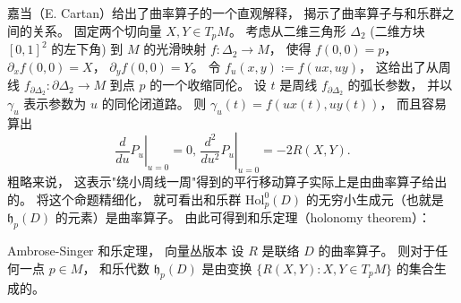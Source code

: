 嘉当（E. Cartan）给出了曲率算子的一个直观解释， 揭示了曲率算子与和乐群之间的关系。 固定两个切向量 $X,Y\in T_pM$。 考虑从二维三角形 $\Delta_2$ (二维方块 $[0,1]^2$ 的左下角) 到 $M$ 的光滑映射 $f:\Delta_2\to M$， 使得 $f(0,0)=p$， $\partial_xf(0,0)=X$， $\partial_yf(0,0)=Y$。 令 $f_u(x,y):=f(ux,uy)$， 这给出了从周线 $f_{\partial\Delta_2}:\partial\Delta_2\to M$ 到点 $p$ 的一个收缩同伦。 设 $t$ 是周线 $f_{\partial\Delta_2}$ 的弧长参数， 并以 $\gamma_u$ 表示参数为 $u$ 的同伦闭道路。 则 $\gamma_u(t)=f(ux(t),uy(t))$， 而且容易算出
$$
\left.\frac{d}{du}P_u\right|_{u=0}=0,\,\left.\frac{d^2}{du^2}P_u\right|_{u=0}=-2R(X,Y).
$$
粗略来说， 这表示"绕小周线一周"得到的平行移动算子实际上是由曲率算子给出的。 将这个命题精细化， 就可看出和乐群 $\text{Hol}_p^0(D)$ 的无穷小生成元（也就是 $\mathfrak{h}_p(D)$ 的元素）是曲率算子。 由此可得到和乐定理（holonomy theorem）：

\begin{theorem}{Ambrose-Singer 和乐定理， 向量丛版本}
设 $R$ 是联络 $D$ 的曲率算子。 则对于任何一点 $p\in M$， 和乐代数 $\mathfrak{h}_p(D)$ 是由变换 $\{R(X,Y):X,Y\in T_pM\}$ 的集合生成的。
\end{theorem}

